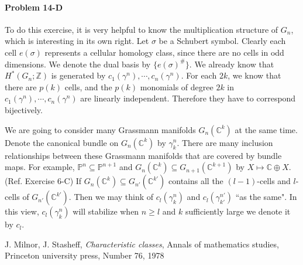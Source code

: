 \documentclass[12pt]{article}
\theoremstyle{plain}
\theoremstyle{definition}
\newcommand{\IC}{\mathbb{C}}
\newcommand{\IP}{\mathbb{P}}
\newcommand{\IZ}{\mathbb{Z}}
\newcommand{\<}{\langle}
\renewcommand{\>}{\rangle}
\begin{document}
\paragraph{Problem 14-D}
To do this exercise, it is very helpful to know the multiplication structure of $G_n$, which is interesting in its own right. Let $\sigma$ be a Schubert symbol. Clearly each cell $e(\sigma)$ represents a cellular homology class, since there are no cells in odd dimensions. We denote the dual basis by $\{ e(\sigma)^\# \}$. We already know that $H^*(G_n; \IZ)$ is generated by $c_1(\gamma^n), \cdots, c_n(\gamma^n)$. For each $2k$, we know that there are $p(k)$ cells, and the $p(k)$ monomials of degree $2k$ in $c_1(\gamma^n), \cdots, c_n(\gamma^n)$ are linearly independent. Therefore they have to correspond bijectively. 

We are going to consider many Grassmann manifolds $G_n(\IC^k)$ at the same time. Denote the canonical bundle on $G_n(\IC^k)$ by $\gamma_k^n$. There are many inclusion relationships between these Grassmann manifolds that are covered by bundle maps. For example, $\IP^n \subseteq \IP^{n + 1}$ and $G_n(\IC^k) \subseteq G_{n + 1}(\IC^{k + 1})$ by $X \mapsto \IC \oplus X$. (Ref. Exercise 6-C) If $G_n(\IC^k) \subseteq G_{n'}(\IC^{k'})$ contains all the $(l-1)$-cells and $l$-cells of $G_{n'}(\IC^{k'})$. Then we may think of $c_l(\gamma^n_k)$ and $c_l(\gamma^{n'}_{k'})$ ``as the same". In this view, $c_l(\gamma^n_k)$ will stabilize when $n \ge l$ and $k$ sufficiently large we denote it by $c_l$. 




\begin{thebibliography}{9}


  J. Milnor, J. Stasheff, \textit{Characteristic classes}, Annals of mathematics studies, Princeton university press, Number 76, 1978
\end{thebibliography}
\end{document}
